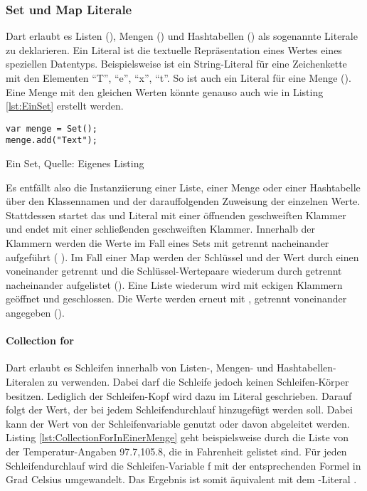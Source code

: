 \subsubsection{Set und Map Literale}

Dart erlaubt es Listen (), Mengen () und Hashtabellen () als sogenannte Literale zu deklarieren.
Ein Literal ist die textuelle Repräsentation eines Wertes eines speziellen Datentyps.
Beispielsweise ist   ein String-Literal für eine Zeichenkette mit den Elementen \enquote{T}, \enquote{e}, \enquote{x}, \enquote{t}.
So ist auch   ein Literal für eine Menge ().
Eine Menge mit den gleichen Werten könnte genauso auch wie in Listing \ref{lst:EinSet} erstellt werden.

\ifincludeall
  \begin{listing}[ht]
    \begin{verbatim}
var menge = Set();
menge.add("Text");
\end{verbatim}
    \caption[Ein Set]{Ein Set, Quelle: Eigenes Listing}
    \label{lst:EinSet}
  \end{listing}
\fi

Es entfällt also die Instanziierung einer Liste, einer Menge oder einer Hashtabelle über den Klassennamen und der darauffolgenden Zuweisung der einzelnen Werte.
Stattdessen startet das  und  Literal mit einer öffnenden geschweiften Klammer und endet mit einer schließenden geschweiften Klammer.
Innerhalb der Klammern werden die Werte im Fall eines Sets mit \IC{,} getrennt nacheinander aufgeführt (  ).
Im Fall einer Map werden der Schlüssel und der Wert durch einen \IC{:} voneinander getrennt und die Schlüssel-Wertepaare wiederum durch \IC{,} getrennt nacheinander aufgelistet ().
Eine Liste wiederum wird mit eckigen Klammern geöffnet und geschlossen.
Die Werte werden erneut mit , getrennt voneinander angegeben (\IC{[1,2]}).

\paragraph{Collection for} Dart erlaubt es Schleifen innerhalb von Listen-, Mengen- und Hashtabellen-Literalen zu verwenden.
Dabei darf die Schleife jedoch keinen Schleifen-Körper besitzen.
Lediglich der Schleifen-Kopf wird dazu im Literal geschrieben.
Darauf folgt der Wert, der bei jedem Schleifendurchlauf hinzugefügt werden soll.
Dabei kann der Wert von der Schleifenvariable genutzt oder davon abgeleitet werden.
Listing \ref{lst:CollectionForInEinerMenge} geht beispielsweise durch die Liste von der Temperatur-Angaben 97.7,105.8, die in Fahrenheit gelistet sind.
Für jeden Schleifendurchlauf wird die Schleifen-Variable f mit der entsprechenden Formel in Grad Celsius umgewandelt.
Das Ergebnis ist somit äquivalent mit dem -Literal .


